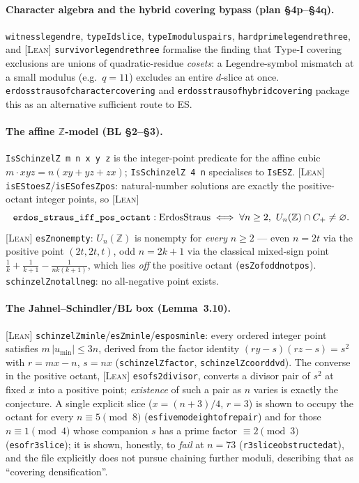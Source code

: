 \documentclass[11pt]{article}
\theoremstyle{plain}
\theoremstyle{definition}
\theoremstyle{remark}
\newcommand{\LEAN}{\textcolor{proved}{\textsc{[Lean]}}}
\newcommand{\lean}[1]{\texttt{#1}}
\renewcommand{\_}{\textunderscore\allowbreak}
\newcommand{\Z}{\mathbb{Z}}
\begin{document}
\paragraph{Character algebra and the hybrid covering bypass (plan \S4p--\S4q).}
\lean{witness\_legendre}, \lean{typeI\_d\_slice}, \lean{typeI\_modulus\_11\_pairs},
\lean{hard\_prime\_legendre\_three}, and \LEAN{} \lean{survivor\_legendre\_three} formalise the
finding that Type-I covering exclusions are unions of quadratic-residue \emph{cosets}: a
Legendre-symbol mismatch at a small modulus (e.g.\ $q=11$) excludes an entire $d$-slice at once.
\lean{erdos\_straus\_of\_character\_covering} and \lean{erdos\_straus\_of\_hybrid\_covering}
package this as an alternative sufficient route to ES.

\paragraph{The affine $\Z$-model (BL \S2--\S3).}
\lean{IsSchinzelZ m n x y z} is the integer-point predicate for the affine cubic
$m\cdot xyz=n(xy+yz+zx)$; \lean{IsSchinzelZ 4 n} specialises to \lean{IsESZ}. \LEAN{}
\lean{isES\_to\_esZ}/\lean{isES\_of\_esZ\_pos}: natural-number solutions are exactly the
positive-octant integer points, so \LEAN{}
\[
\texttt{erdos\_straus\_iff\_pos\_octant} : \mathrm{ErdosStraus} \iff \forall n\ge 2,\
U_n(\Z)\cap C_+ \ne \varnothing.
\]
\LEAN{} \lean{esZ\_nonempty}: $U_n(\Z)$ is nonempty for \emph{every} $n\ge 2$ — even $n=2t$ via
the positive point $(2t,2t,t)$, odd $n=2k+1$ via the classical mixed-sign point
$\tfrac1k+\tfrac1{k+1}-\tfrac1{nk(k+1)}$, which lies \emph{off} the positive octant
(\lean{esZ\_of\_odd\_not\_pos}). \lean{schinzelZ\_not\_all\_neg}: no all-negative point exists.

\paragraph{The Jahnel--Schindler/BL box (Lemma~3.10).}
\LEAN{} \lean{schinzelZ\_min\_le}/\lean{esZ\_min\_le}/\lean{es\_pos\_min\_le}: every ordered
integer point satisfies $m\,|u_{\min}|\le 3n$, derived from the factor identity
$(ry-s)(rz-s)=s^2$ with $r=mx-n$, $s=nx$ (\lean{schinzelZ\_factor}, \lean{schinzelZ\_coord\_dvd}).
The converse in the positive octant, \LEAN{} \lean{es\_of\_s2\_divisor}, converts a divisor pair
of $s^2$ at fixed $x$ into a positive point; \emph{existence} of such a pair as $n$ varies is
exactly the conjecture. A single explicit slice ($x=(n+3)/4$, $r=3$) is shown to occupy the
octant for every $n\equiv5\pmod8$ (\lean{es\_five\_mod\_eight\_of\_repair}) and for those
$n\equiv1\pmod4$ whose companion $s$ has a prime factor $\equiv2\pmod3$
(\lean{es\_of\_r3\_slice}); it is shown, honestly, to \emph{fail} at $n=73$
(\lean{r3\_slice\_obstructed\_at\_73}), and the file explicitly does not pursue chaining further
moduli, describing that as ``covering densification''.
\end{document}

